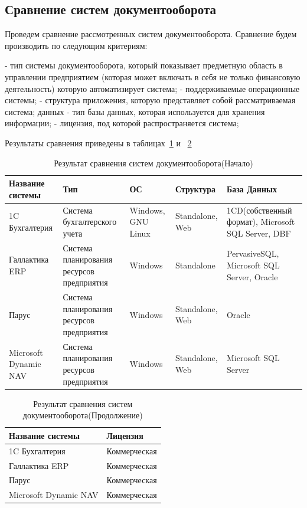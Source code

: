 \documentclass[14pt,a4paper]{reportmod}
\begin{document}
\subsection{Сравнение систем документооборота}
Проведем сравнение рассмотренных систем документооборота. Сравнение будем производить по следующим критериям:
\begin{itemize}
   - тип системы документооборота, который показывает предметную область в управлении предприятием (которая может включать в себя не только финансовую деятельность) которую автоматизирует система;
   - поддерживаемые операционные системы;
   - структура приложения, которую представляет собой рассматриваемая система;
   данных - тип базы данных, которая используется для хранения информации;
   - лицензия, под которой распространяется система;
\end{itemize}
Результаты сравнения приведены в таблицах~\ref{tabl:analys_1} и ~\ref{tabl:analys_2}
\begin{table}
  \centering
  \caption{Результат сравнения систем документооборота(Начало)}
  \label{tabl:analys_1}
\begin{tabular}{|m{3.2cm}|m{3cm}|m{2cm}|m{2.5cm}|m{4cm}|}
  \hline
  \bfseries{Название системы} &
  \bfseries{Тип} &
  \bfseries{ОС} &
  \bfseries{Структура} &
  \bfseries{База Данных}\\
  \hline
  1C Бухгалтерия & Система бухгалтерского учета & Windows, GNU Linux & Standalone, Web & 1CD(собственный формат), Microsoft SQL Server, DBF\\
  \hline
  Галлактика ERP & Система планирования ресурсов предприятия & Windows  & Standalone  & PervasiveSQL, Microsoft SQL Server, Oracle\\
  \hline
  Парус & Система планирования ресурсов предприятия & Windows & Standalone, Web & Oracle\\
  \hline
  Microsoft Dynamic NAV & Система планирования ресурсов предприятия & Windows & Standalone, Web & Microsoft SQL Server\\
  \hline
\end{tabular}
\end{table}
\begin{table}
  \centering
  \caption{Результат сравнения систем документооборота(Продолжение)}
  \label{tabl:analys_2}
\begin{tabular}{|m{6cm}|m{4cm}|}
  \hline
  \bfseries{Название системы} &
  \bfseries{Лицензия}\\
  \hline
  1C Бухгалтерия & Коммерческая\\
  \hline
  Галлактика ERP & Коммерческая\\
  \hline
  Парус & Коммерческая\\
  \hline
  Microsoft Dynamic NAV & Коммерческая\\
  \hline
\end{tabular}
\end{table}
\end{document}
